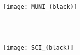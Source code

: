 \documentclass[12pt,a4paper,oneside,final]{book}
\begin{document}


\pagestyle{empty}



\changetext{}{11.6mm}{}{}{}
\begin{adjustwidth}{-12mm}{}
\hspace{2mm}
\begin{minipage}{170mm}
  \begin{center}\vspace*{3mm}
    {\fontsize{28pt}{28pt}}\\[2mm]
    {\fontsize{26pt}{28pt}}\\[1mm] %
  \end{center}
\end{minipage}\hspace{2mm}
\end{adjustwidth}
\changetext{}{-11.6mm}{}{}{}

 \vspace{8cm}

  \begin{center}
      {\fontsize{28pt}{26pt}\selectfont{Dissertation}}\\
  \end{center}


\vfill


\begin{center}
{\fontsize{20pt}{28pt}\selectfont{Brno 2021} \hfill \selectfont{Stanislav Geidl}}
\end{center}
\clearpage

\changetext{}{11.6mm}{}{}{}
\begin{adjustwidth}{-12mm}{}
 \hspace{12mm}
\begin{minipage}{28mm}
  \texttt{[image: MUNI\_(black)]}
\end{minipage}\hspace{2mm}
\begin{minipage}{90mm}
  \begin{center}\vspace*{3mm}
    {\fontsize{20pt}{28pt}}\\[2mm]
    {\fontsize{19pt}{28pt}}\\[1mm] %
  \end{center}
\end{minipage}\hspace{2mm}
\begin{minipage}{28mm}
  \texttt{[image: SCI\_(black)]}
\end{minipage}
\end{adjustwidth}
\changetext{}{-11.6mm}{}{}{}
\end{document}
